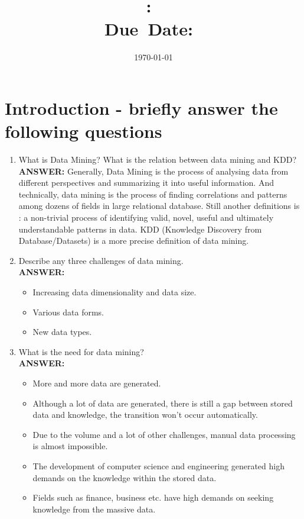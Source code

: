 \documentclass{article}
\title{\textbf{\hmwkClass:\ 
      \hmwkTitle}\\\normalsize\small{Due\ Date:\
    \hmwkDueDate}}
\date{\today}
\author{\textbf{\hmwkAuthorName}}
\begin{document}
\maketitle

\section{Introduction - briefly answer the following questions}
\begin{enumerate}
\item What is Data Mining? What is the relation between data mining and
  KDD? \\

\textbf{ANSWER:} Generally, Data Mining is the process of analysing data
from different perspectives and summarizing it into useful
information. And technically, data mining is the process of finding
correlations and patterns among dozens of fields in large relational
database. Still another definitions is : a non-trivial process of
identifying valid, novel, useful and ultimately understandable patterns
in data. KDD (Knowledge Discovery from Database/Datasets) is a more
precise definition of data mining. 
\item Describe any three challenges of data mining. \\

\textbf{ANSWER:} 
\begin{itemize}
\item Increasing data dimensionality and data size. 
\item Various data forms. 
\item New data types. 
\end{itemize}

\item What is the need for data mining? \\

\textbf{ANSWER:} 
\begin{itemize}
\item More and more data are generated. 
\item Although a lot of data are generated, there is still a gap between
  stored data and knowledge, the transition won't occur automatically. 
\item Due to the volume and a lot of other challenges, manual data
  processing is almost impossible. 
\item The development of computer science and engineering generated
  high demands on the knowledge within the stored data. 
\item Fields such as finance, business etc. have high demands on seeking
  knowledge from the massive data. 
\end{itemize}
\end{enumerate}
\end{document}
